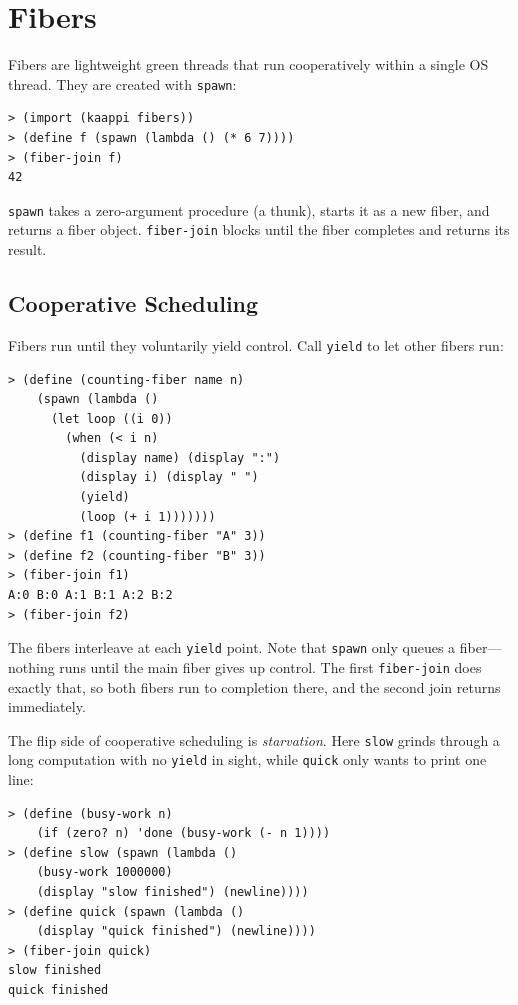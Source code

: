 \section{Fibers}

Fibers are lightweight green threads that run cooperatively within a single OS thread. They are created with \texttt{spawn}:

\begin{lstlisting}[style=repl]
> (import (kaappi fibers))
> (define f (spawn (lambda () (* 6 7))))
> (fiber-join f)
42
\end{lstlisting}

\texttt{spawn} takes a zero-argument procedure (a thunk), starts it as a new fiber, and returns a fiber object. \texttt{fiber-join} blocks until the fiber completes and returns its result.

\subsection{Cooperative Scheduling}

Fibers run until they voluntarily yield control. Call \texttt{yield} to let other fibers run:

\begin{lstlisting}[style=repl]
> (define (counting-fiber name n)
    (spawn (lambda ()
      (let loop ((i 0))
        (when (< i n)
          (display name) (display ":")
          (display i) (display " ")
          (yield)
          (loop (+ i 1)))))))
> (define f1 (counting-fiber "A" 3))
> (define f2 (counting-fiber "B" 3))
> (fiber-join f1)
A:0 B:0 A:1 B:1 A:2 B:2
> (fiber-join f2)
\end{lstlisting}

The fibers interleave at each \texttt{yield} point. Note that \texttt{spawn} only queues a fiber---nothing runs until the main fiber gives up control. The first \texttt{fiber-join} does exactly that, so both fibers run to completion there, and the second join returns immediately.

The flip side of cooperative scheduling is \emph{starvation}. Here \texttt{slow} grinds through a long computation with no \texttt{yield} in sight, while \texttt{quick} only wants to print one line:

\begin{lstlisting}[style=repl]
> (define (busy-work n)
    (if (zero? n) 'done (busy-work (- n 1))))
> (define slow (spawn (lambda ()
    (busy-work 1000000)
    (display "slow finished") (newline))))
> (define quick (spawn (lambda ()
    (display "quick finished") (newline))))
> (fiber-join quick)
slow finished
quick finished
\end{lstlisting}

